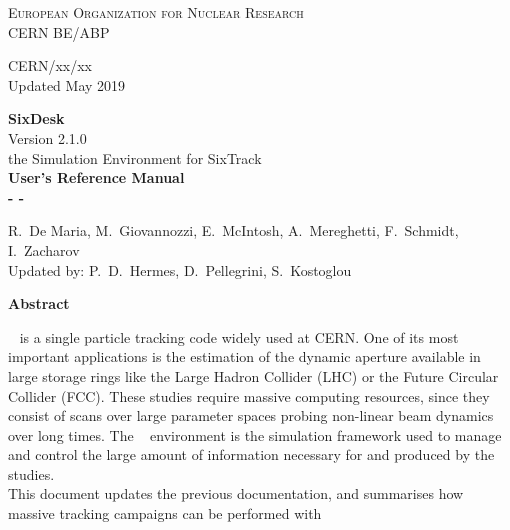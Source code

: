 \begin{titlepage}
\begin{center}\normalsize\scshape
    European Organization for Nuclear Research \\
    CERN BE/ABP
\end{center}
\vspace*{2mm}
\begin{flushright}
    CERN/xx/xx \\
    Updated May 2019
\end{flushright}
\begin{center}\Huge
    \textbf{SixDesk} \\
    \LARGE Version 2.1.0 \\
    \vspace*{8mm} the Simulation Environment for SixTrack\\
    \vspace*{8mm}\textbf{User's Reference Manual}\\
    \vspace*{8mm}\textbf{- \whichSixTrack{} -}
\end{center}
\begin{center}
    \vspace*{2mm}
  R.~De Maria, M.~Giovannozzi, E.~McIntosh, A.~Mereghetti, F.~Schmidt,
  I.~Zacharov \\
    \vspace*{2mm}Updated by:
    P.~D.~Hermes, D.~Pellegrini, S.~Kostoglou
\end{center}
\begin{center}\large
    \vspace*{10mm}\textbf{Abstract} \\
\end{center}
\SIXTRACK{}~\cite{SixTrack_user_manual,SixPub,sixtrackWeb}
is a single particle tracking code widely used at CERN. One of its
most important applications is the estimation of the dynamic aperture available
in large storage rings like the Large Hadron Collider (LHC) or the Future
Circular Collider (FCC). These studies require massive computing resources,
since they consist of scans over large parameter spaces probing non-linear beam
dynamics over long times.
The \SIXDESK{}~\cite{SixDesk_original,SixDesk_updated} environment is the
simulation framework used to manage and control the large amount of
information necessary for and produced by the studies. \\
This document updates the previous documentation, and summarises how massive
tracking campaigns can be performed with \SIXTRACK{}

\end{titlepage}
